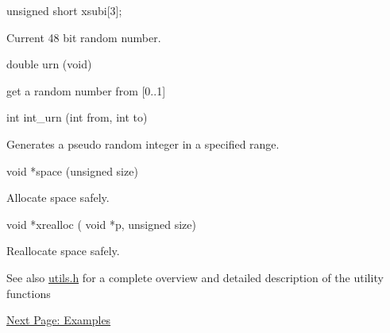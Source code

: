 \begin{DoxyVerb}
unsigned short xsubi[3];
\end{DoxyVerb}
 Current 48 bit random number. 

\begin{DoxyVerb}
double urn (void)
\end{DoxyVerb}
 get a random number from \mbox{[}0..1\mbox{]} 

\begin{DoxyVerb}
int    int_urn (int from, int to)
\end{DoxyVerb}
 Generates a pseudo random integer in a specified range. 

\begin{DoxyVerb}
void  *space (unsigned size)
\end{DoxyVerb}
 Allocate space safely. 

\begin{DoxyVerb}
void  *xrealloc ( void *p,
                  unsigned size)
\end{DoxyVerb}
 Reallocate space safely. 

\begin{DoxySeeAlso}{See also}
\hyperlink{utils_8h}{utils.h} for a complete overview and detailed description of the utility functions
\end{DoxySeeAlso}


\hyperlink{mp__example}{Next Page: Examples} 
